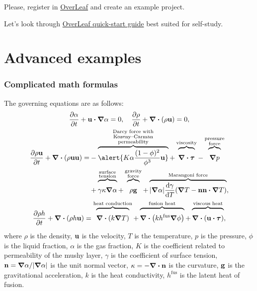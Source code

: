 \documentclass[mathserif]{beamer}
\newcommand{\bv}{\vb{u}}                    %
\newcommand{\bn}{\vb{n}}                    %
\newcommand{\fusion}[1]{{#1}^\mathrm{fus}}  %
\newcommand{\xoverbrace}[2][\vphantom{\int}]{\overbrace{#1#2}}
\begin{document}
\begin{frame}
    \frametitle{}
    \centering
    Please, register in \href{https://overleaf.com}{OverLeaf}
    and create an example project.
    \pause

    Let's look through \href{https://www.overleaf.com/learn/latex/Learn_LaTeX_in_30_minutes}
    {OverLeaf quick-start guide} best suited for self-study.
\end{frame}

\section{Advanced examples}

\begin{frame}
    \frametitle{Complicated math formulas}\footnotesize
    The governing equations are as follows:
    \begin{gather*}
        \pdv{\alpha}{t} + \bv\vdot\grad\alpha = 0, \quad \pdv{\rho}{t} + \div(\rho\bv) = 0, \\
        \begin{aligned}
        \pdv{\rho\bv}{t} + \div(\rho\bv\bv) =
            &- \xoverbrace{\alert{K\alpha\frac{(1-\phi)^2}{\phi^3}\bv}}
                ^{\substack{\text{Darcy force with}\\\text{Kozeny--Carman}\\\text{permeability}}}
            + \xoverbrace{\div\vb*\tau}^\text{viscosity}
            - \xoverbrace{\grad{p}}^{\substack{\text{pressure}\\\text{force}}}\\
            &+ \xoverbrace{\gamma\kappa\grad\alpha}^{\substack{\text{surface}\\\text{tension}}}
            + \xoverbrace{\rho\vb{g}}^{\substack{\text{gravity}\\\text{force}}}
            + \xoverbrace{|\grad\alpha|\dv{\gamma}{T}\qty(\grad{T}
                - \bn\bn\vdot\grad{T})}^\text{Marangoni force},
        \end{aligned}\\
        \pdv{\rho h}{t} + \div(\rho h\bv)
            = \xoverbrace{\div(k\grad{T})}^\text{heat conduction}
            + \xoverbrace{\div(k\fusion{h}\grad{\phi})}^\text{fusion heat}
            + \xoverbrace{\div(\bv\vdot\vb*\tau)}^\text{viscous heat},
    \end{gather*}
    \scriptsize
    where \(\rho\) is the density, \(\bv\) is the velocity, \(T\) is the temperature,
    \(p\) is the pressure, \(\phi\) is the liquid fraction, \(\alpha\) is the gas fraction,
    \(K\) is the coefficient related to permeability of the mushy layer,
     \(\gamma\) is the coefficient of surface tension,
    \(\bn = \grad\alpha/|\grad\alpha|\) is the unit normal vector,
    \(\kappa = -\div{\bn}\) is the curvature, \(\vb{g}\) is the gravitational acceleration,
    \(k\) is the heat conductivity, \(\fusion{h}\) is the latent heat of fusion.
\end{frame}
\end{document}
